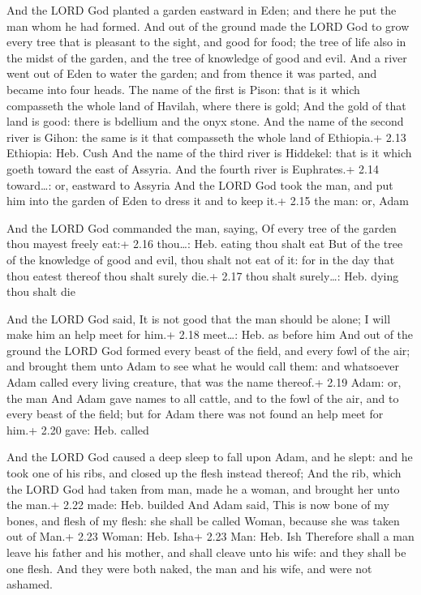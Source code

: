  And the LORD God planted a garden eastward in Eden; and
there he put the man whom he had formed.  And out of the
ground made the LORD God to grow every tree that is pleasant to the
sight, and good for food; the tree of life also in the midst of the
garden, and the tree of knowledge of good and evil.  And a
river went out of Eden to water the garden; and from thence it was
parted, and became into four heads.  The name of the first
is Pison: that is it which compasseth the whole land of Havilah, where
there is gold;  And the gold of that land is good: there is
bdellium and the onyx stone.  And the name of the second
river is Gihon: the same is it that compasseth the whole land of
Ethiopia.+ 2.13 Ethiopia: Heb. Cush  And the name of the
third river is Hiddekel: that is it which goeth toward the east of
Assyria. And the fourth river is Euphrates.+ 2.14 toward\ldots: or,
eastward to Assyria  And the LORD God took the man, and put
him into the garden of Eden to dress it and to keep it.+ 2.15 the man:
or, Adam

 And the LORD God commanded the man, saying, Of every tree
of the garden thou mayest freely eat:+ 2.16 thou\ldots: Heb. eating thou
shalt eat  But of the tree of the knowledge of good and
evil, thou shalt not eat of it: for in the day that thou eatest thereof
thou shalt surely die.+ 2.17 thou shalt surely\ldots: Heb. dying thou
shalt die

 And the LORD God said, It is not good that the man
should be alone; I will make him an help meet for him.+ 2.18 meet\ldots:
Heb. as before him  And out of the ground the LORD God
formed every beast of the field, and every fowl of the air; and brought
them unto Adam to see what he would call them: and whatsoever Adam
called every living creature, that was the name thereof.+ 2.19 Adam: or,
the man  And Adam gave names to all cattle, and to the fowl
of the air, and to every beast of the field; but for Adam there was not
found an help meet for him.+ 2.20 gave: Heb. called

 And the LORD God caused a deep sleep to fall upon Adam,
and he slept: and he took one of his ribs, and closed up the flesh
instead thereof;  And the rib, which the LORD God had taken
from man, made he a woman, and brought her unto the man.+ 2.22 made:
Heb. builded  And Adam said, This is now bone of my bones,
and flesh of my flesh: she shall be called Woman, because she was taken
out of Man.+ 2.23 Woman: Heb. Isha+ 2.23 Man: Heb. Ish 
Therefore shall a man leave his father and his mother, and shall cleave
unto his wife: and they shall be one flesh.  And they were
both naked, the man and his wife, and were not ashamed.

